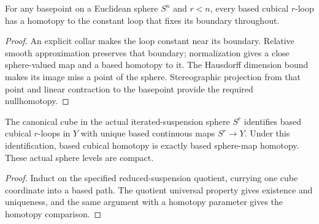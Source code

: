 \begin{proposition}
  \label{prop:euclidean-sphere-high-connectivity}
  \leanok
  For any basepoint on a Euclidean sphere $S^n$ and $r<n$, every
  based cubical $r$-loop has a homotopy to the constant loop that
  fixes its boundary throughout.
\end{proposition}
\begin{proof}
  An explicit collar makes the loop constant near its boundary.
  Relative smooth approximation preserves that boundary; normalization
  gives a close sphere-valued map and a based homotopy to it.
  The Hausdorff dimension bound makes its image miss a point of the
  sphere. Stereographic projection from that point and linear contraction
  to the basepoint provide the required nullhomotopy.
  \leanok
\end{proof}

\begin{proposition}
  \label{prop:cubical-sphere-representatives}
  \leanok
  The canonical cube in the actual iterated-suspension sphere
  $S^r$ identifies based cubical $r$-loops in $Y$ with unique based
  continuous maps $S^r\to Y$. Under this identification, based cubical
  homotopy is exactly based sphere-map homotopy. These actual sphere
  levels are compact.
\end{proposition}
\begin{proof}
  Induct on the specified reduced-suspension quotient, currying
  one cube coordinate into a based path. The quotient universal
  property gives existence and uniqueness, and the same argument
  with a homotopy parameter gives the homotopy comparison.
  \leanok
\end{proof}

